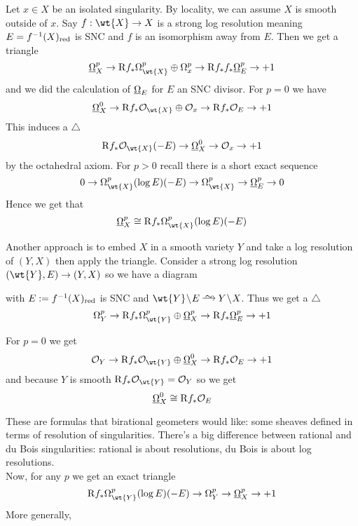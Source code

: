 \documentclass[12pt]{article}
\newcommand{\R}{\mathrm{R}}
\begin{document}
\begin{example}
Let $x \in X$ be an isolated singularity. By locality, we can assume $X$ is smooth outside of $x$. Say $f : \wt{X} \to X$ is a strong log resolution meaning $E = f^{-1}(X)_{\mathrm{red}}$ is SNC and $f$ is an isomorphism away from $E$. Then we get a triangle
\[ \ul{\Omega}_X^p \to \R f_* \Omega_{\wt{X}}^p \oplus \Omega_x^p \to \R f_* f_* \ul{\Omega}_E^p \to + 1 \]
and we did the calculation of $\underline{\Omega}_E$ for $E$ an SNC divisor. For $p = 0$ we have
\[ \ul{\Omega}_X^0 \to \R f_* \struct{\wt{X}} \oplus \struct{x} \to \R f_* \struct{E} \to +1 \]
This induces a $\triangle$
\[ \R f_* \struct{\wt{X}}(-E) \to \ul{\Omega}_X^0 \to \struct{x} \to + 1 \]
by the octahedral axiom. For $p > 0$ recall there is a short exact sequence
\[ 0 \to \Omega_{\wt{X}}^p(\log{E})(-E) \to \Omega_{\wt{X}}^p \to \ul{\Omega}_E^p \to 0 \]
Hence we get that
\[ \ul{\Omega}_X^p \cong \R f_* \Omega_{\wt{X}}^p(\log{E})(-E) \]
\end{example}

Another approach is to embed $X$ in a smooth variety $Y$ and take a log resolution of $(Y,X)$ then apply the triangle. Consider a strong log resolution $(\wt{Y}, E) \to (Y, X)$ so we have a diagram
\begin{center}
\end{center}
with $E := f^{-1}(X)_{\mathrm{red}}$ is SNC and $\wt{Y} \sm E \iso Y \sm X$. Thus we get a $\triangle$
\[ \Omega_Y^p \to \R f_* \Omega_{\wt{Y}}^p \oplus \ul{\Omega}_X^p \to \R f_* \ul{\Omega}_E^p \to + 1 \]

\begin{example}
For $p = 0$ we get
\[ \struct{Y} \to \R f_* \struct{\wt{Y}} \oplus \ul{\Omega}_X^0 \to \R f_* \struct{E} \to + 1 \]
and because $Y$ is smooth $\R f_* \struct{\wt{Y}} = \struct{Y}$ so we get
\[ \ul{\Omega}_X^0 \cong \R f_* \struct{E} \]
\end{example}

These are formulas that birational geometers would like: some sheaves defined in terms of resolution of singularities. There's a big difference between rational and du Bois singularities: rational is about resolutions, du Bois is about log resolutions. 
\bigskip\\
Now, for any $p$ we get an exact triangle
\[ \R f_* \Omega_{\wt{Y}}^p(\log{E})(-E) \to \Omega_Y^p \to \ul{\Omega}_X^p \to + 1 \]
More generally, 
\end{document}
